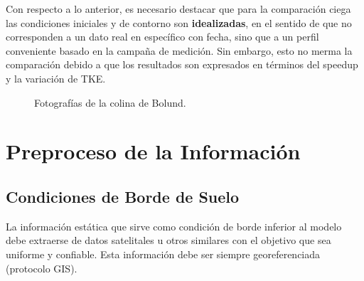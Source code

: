 Con respecto a lo anterior, es necesario destacar que para la comparación ciega las condiciones iniciales y de contorno  son \textbf{idealizadas}, en el sentido de que no corresponden a un dato real en específico con fecha, sino que a un perfil conveniente basado en la campaña de medición. Sin embargo, esto no merma la comparación debido a que los resultados son expresados en términos del speedup y la variación de TKE.

\begin{figure}[H]
	\centering{}%
	\caption{Fotografías de la colina de Bolund.}
	\label{fig:05_terreno_bolund}
\end{figure}

\newpage
\section{Preproceso de la Información}
\subsection{Condiciones de Borde de Suelo}
La información estática que sirve como condición de borde inferior al modelo debe extraerse de datos satelitales u otros similares con el objetivo que sea uniforme y confiable. Esta información debe ser siempre georeferenciada (protocolo GIS).

